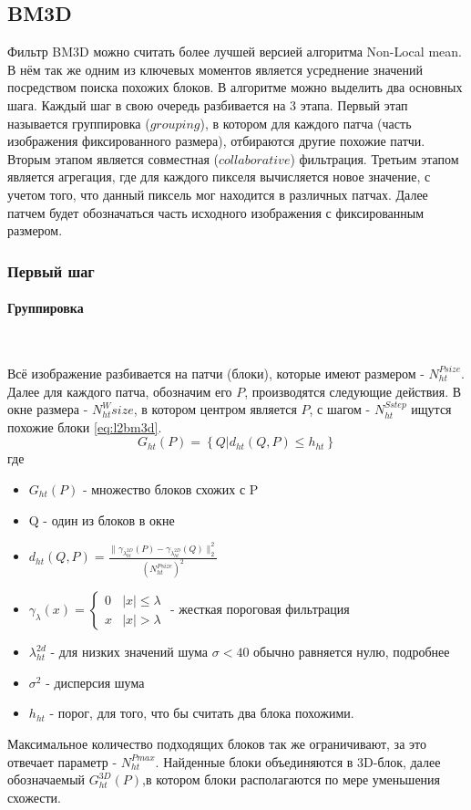 \subsection{BM3D}
Фильтр BM3D можно считать более лучшей версией алгоритма Non-Local mean. В нём так же одним из ключевых моментов является
усреднение значений посредством поиска похожих блоков. В алгоритме можно выделить два основных шага. Каждый шаг в свою очередь разбивается на 3 этапа. Первый этап называется группировка ($grouping$), в котором для каждого патча (часть изображения фиксированного размера), отбираются другие похожие патчи. Вторым этапом является совместная ($collaborative$) фильтрация. Третьим этапом является агрегация, где для каждого пикселя вычисляется новое значение, с учетом того, что данный пиксель мог находится в различных патчах.
Далее патчем будет обозначаться часть исходного изображения с фиксированным размером.
\subsubsection{Первый шаг}
\paragraph{Группировка}\

Всё изображение разбивается на патчи (блоки), которые имеют размером - $N_{ht}^{Psize}$.  Далее для каждого патча, обозначим его $P$, производятся следующие действия. В окне размера - $N_{ht}^Wsize$, в котором центром является $P$, с шагом - $N_{ht}^{Sstep}$ ищутся похожие блоки  \ref{eq:l2bm3d}.
\begin{equation}\label{eq:l2bm3d}
	G_{ht}(P) = \left\{Q | d_{ht}(Q,P) \leq h_{ht}\right\}
\end{equation}
где
\begin{itemize}
	\item $G_{ht}(P)$ - множество блоков схожих с P
	\item Q - один из блоков в окне
	\item $d_{ht}(Q,P) = \frac{\parallel\gamma_{\lambda_{ht}^{2D}}(P)-\gamma_{\lambda_{ht}^{2D}}(Q)\parallel_2^2}{(N_{ht}^{Psize})^2}$
	\item $\gamma_{\lambda}(x) = \begin{cases}0 &|x| \leq \lambda\\ x & |x| > \lambda\end{cases}$ - жесткая пороговая фильтрация 
	\item $\lambda_{ht}^{2d}$ - для низких значений шума $\sigma < 40$ обычно равняется нулю, подробнее \cite{dabov}
	\item $\sigma^2$ -  дисперсия шума
	\item $h_{ht}$ - порог, для того, что бы считать два блока похожими.
\end{itemize}
Максимальное количество подходящих блоков так же ограничивают, за это отвечает параметр - $N_{ht}^{Pmax}$. Найденные блоки объединяются в 3D-блок, далее обозначаемый $G_{ht}^{3D}(P)$,в котором блоки располагаются по мере уменьшения схожести.

